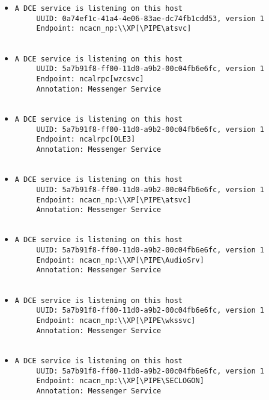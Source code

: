 \documentclass{article}
\begin{document}
\begin{itemize}
\begin{verbatim}
\end{verbatim}\item \begin{verbatim}
A DCE service is listening on this host
     UUID: 0a74ef1c-41a4-4e06-83ae-dc74fb1cdd53, version 1
     Endpoint: ncacn_np:\\XP[\PIPE\atsvc]


\end{verbatim}\item \begin{verbatim}
A DCE service is listening on this host
     UUID: 5a7b91f8-ff00-11d0-a9b2-00c04fb6e6fc, version 1
     Endpoint: ncalrpc[wzcsvc]
     Annotation: Messenger Service


\end{verbatim}\item \begin{verbatim}
A DCE service is listening on this host
     UUID: 5a7b91f8-ff00-11d0-a9b2-00c04fb6e6fc, version 1
     Endpoint: ncalrpc[OLE3]
     Annotation: Messenger Service


\end{verbatim}\item \begin{verbatim}
A DCE service is listening on this host
     UUID: 5a7b91f8-ff00-11d0-a9b2-00c04fb6e6fc, version 1
     Endpoint: ncacn_np:\\XP[\PIPE\atsvc]
     Annotation: Messenger Service


\end{verbatim}\item \begin{verbatim}
A DCE service is listening on this host
     UUID: 5a7b91f8-ff00-11d0-a9b2-00c04fb6e6fc, version 1
     Endpoint: ncacn_np:\\XP[\PIPE\AudioSrv]
     Annotation: Messenger Service


\end{verbatim}\item \begin{verbatim}
A DCE service is listening on this host
     UUID: 5a7b91f8-ff00-11d0-a9b2-00c04fb6e6fc, version 1
     Endpoint: ncacn_np:\\XP[\PIPE\wkssvc]
     Annotation: Messenger Service


\end{verbatim}\item \begin{verbatim}
A DCE service is listening on this host
     UUID: 5a7b91f8-ff00-11d0-a9b2-00c04fb6e6fc, version 1
     Endpoint: ncacn_np:\\XP[\PIPE\SECLOGON]
     Annotation: Messenger Service



\end{verbatim}
\end{itemize}
\end{document}
